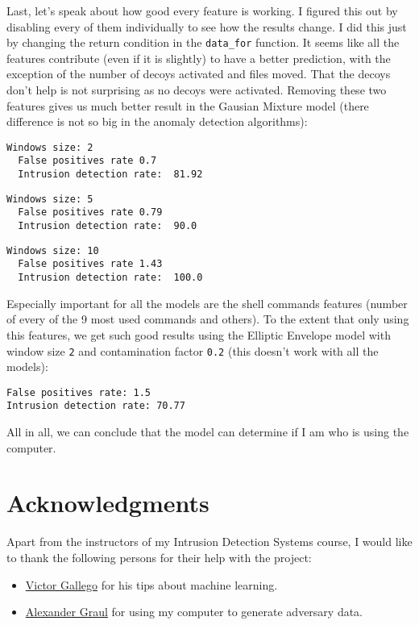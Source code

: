 \documentclass[oneside, 12pt]{article}
\begin{document}
Last, let's speak about how good every feature is working.
I figured this out by disabling every of them individually to see how the results change.
I did this just by changing the return condition in the \texttt{data\_for} function.
It seems like all the features contribute (even if it is slightly) to have a better prediction, with the exception of the number of decoys activated and files moved.
That the decoys don't help is not surprising as no decoys were activated.
Removing these two features gives us much better result in the Gausian Mixture model (there difference is not so big in the anomaly detection algorithms):

\begin{lstlisting}
Windows size: 2
  False positives rate 0.7
  Intrusion detection rate:  81.92
\end{lstlisting}
\pagebreak

\begin{lstlisting}
Windows size: 5
  False positives rate 0.79
  Intrusion detection rate:  90.0
\end{lstlisting}
\begin{lstlisting}
Windows size: 10
  False positives rate 1.43
  Intrusion detection rate:  100.0
\end{lstlisting}

Especially important for all the models are the shell commands features (number of every of the 9 most used commands and others).
To the extent that only using this features, we get such good results using the Elliptic Envelope model with window size \texttt{2} and contamination factor \texttt{0.2} (this doesn't work with all the models):

\begin{lstlisting}
False positives rate: 1.5
Intrusion detection rate: 70.77
\end{lstlisting}

All in all, we can conclude that the model can determine if I am who is using the computer.

\section{Acknowledgments}

Apart from the instructors of my Intrusion Detection Systems course, I would like to thank the following persons for their help with the project:

\begin{itemize}
\item \href{https://vicgalle.github.io}{Victor Gallego} for his tips about machine learning.
\label{agraul}
\item \href{https://github.com/agraul}{Alexander Graul} for using my computer to generate adversary data.
\end{itemize}


\end{document}
